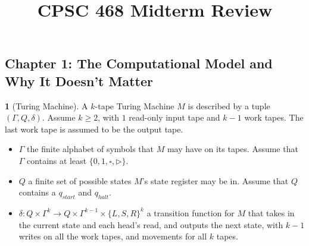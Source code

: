 \documentclass[10pt]{article}
\title{CPSC 468 Midterm Review}
\author{}
\date{}
\theoremstyle{definition}
\newtheorem{note}{}[section]
\begin{document}
\maketitle

\newcommand{\E}{\mathrm{E}}
\newcommand{\Var}{\mathrm{Var}}
\newcommand{\Real}{\mathrm{Re}}
\newcommand{\Imag}{\mathrm{Im}}
\newcommand{\res}{\mathrm{res}}
\newcommand{\NP}{\mathrm{NP}}
\newcommand{\NPC}{\mathrm{NP\mhyphen Complete}}
\newcommand{\coNP}{\mathrm{coNP}}
\newcommand{\coNPC}{\mathrm{coNP\mhyphen Complete}}
\newcommand{\DP}{\mathrm{DP}}
\newcommand{\PTIME}{\mathrm{P}}
\newcommand{\AL}{\mathrm{AL}}
\newcommand{\INDSET}{\mathrm{INDSET}}
\newcommand{\NOTINDSET}{\overline{\mathrm{INDSET}}}
\newcommand{\EXACTINDSET}{\mathrm{EXACT\mhyphen INDSET}}
\newcommand{\SAT}{\mathrm{SAT}}
\newcommand{\UNSAT}{\overline{\mathrm{SAT}}}
\newcommand{\TMSAT}{\mathrm{TMSAT}}
\newcommand{\ACCEPT}{\mathrm{ACCEPT}}
\newcommand{\REJECT}{\mathrm{REJECT}}
\newcommand{\DTIME}{\mathrm{DTIME}}
\newcommand{\NTIME}{\mathrm{NTIME}}
\newcommand{\EXP}{\mathrm{EXP}}
\newcommand{\NEXP}{\mathrm{NEXP}}

\newcommand{\st}{\mathrm{\ s.t.\ }}

\subsection*{Chapter 1: The Computational Model and Why It Doesn't Matter}
\begin{note}[Turing Machine]
  A $k$-tape Turing Machine $M$ is described by a tuple $(\Gamma, Q, \delta)$.
  Assume $k \geq 2$, with $1$ read-only input tape and $k - 1$ work tapes.
  The last work tape is assumed to be the output tape.
  \begin{itemize}
    \item
      $\Gamma$ the finite alphabet of symbols that $M$ may have on its tapes.
      Assume that $\Gamma$ contains at least $\{0,1,\square,\triangleright\}$.

    \item
      $Q$ a finite set of possible states $M$'s state register may be in.
      Assume that $Q$ contains a $q_{start}$ and $q_{halt}$.

    \item
      $\delta : Q \times \Gamma^k \to Q
      \times \Gamma^{k - 1} \times \{L, S, R\}^k$ a transition function for
      $M$ that takes in the current state and each head's read, and outputs
      the next state, with $k - 1$ writes on all the work tapes, and movements
      for all $k$ tapes.
  \end{itemize}
\end{note}
\end{document}
